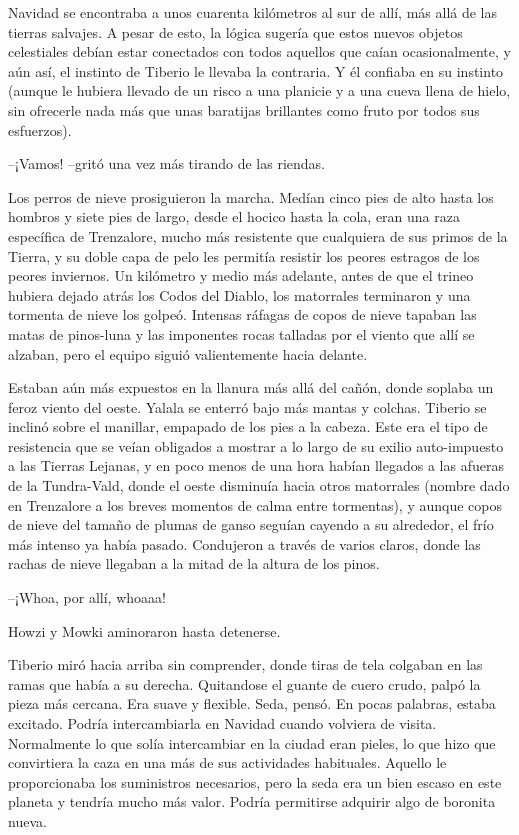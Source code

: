 Navidad se encontraba a unos cuarenta kilómetros al sur de allí, más allá de las tierras salvajes. A pesar de esto, la lógica sugería que estos nuevos objetos celestiales debían estar conectados con todos aquellos que caían ocasionalmente, y aún así, el instinto de Tiberio le llevaba la contraria. Y él confiaba en su instinto (aunque le hubiera llevado de un risco a una planicie y a una cueva llena de hielo, sin ofrecerle nada más que unas baratijas brillantes como fruto por todos sus esfuerzos).
 
--¡Vamos! --gritó una vez más tirando de las riendas.
 
Los perros de nieve prosiguieron la marcha. Medían cinco pies de alto hasta los hombros y siete pies de largo, desde el hocico hasta la cola, eran una raza específica de Trenzalore, mucho más resistente que cualquiera de sus primos de la Tierra, y su doble capa de pelo les permitía resistir los peores estragos de los peores inviernos. Un kilómetro y medio más adelante, antes de que el trineo hubiera dejado atrás los Codos del Diablo, los matorrales terminaron y una tormenta de nieve los golpeó. Intensas ráfagas de copos de nieve tapaban las matas de pinos-luna y las imponentes rocas talladas por el viento que allí se alzaban, pero el equipo siguió valientemente hacia delante.
 
Estaban aún más expuestos en la llanura más allá del cañón, donde soplaba un feroz viento del oeste. Yalala se enterró bajo más mantas y colchas. Tiberio se inclinó sobre el manillar, empapado de los pies a la cabeza. Este era el tipo de resistencia que se veían obligados a mostrar a lo largo de su exilio auto-impuesto a las Tierras Lejanas, y en poco menos de una hora habían llegados a las afueras de la Tundra-Vald, donde el oeste disminuía hacia otros matorrales (nombre dado en Trenzalore a los breves momentos de calma entre tormentas), y aunque copos de nieve del tamaño de plumas de ganso seguían cayendo a su alrededor, el frío más intenso ya había pasado. Condujeron a través de varios claros, donde las rachas de nieve llegaban a la mitad de la altura de los pinos.
 
--¡Whoa, por allí, whoaaa!
 
Howzi y Mowki aminoraron hasta detenerse.
 
Tiberio miró hacia arriba sin comprender, donde tiras de tela colgaban en las ramas que había a su derecha. Quitandose el guante de cuero crudo, palpó la pieza más cercana. Era suave y flexible. Seda, pensó. En pocas palabras, estaba excitado. Podría intercambiarla en Navidad cuando volviera de visita. Normalmente lo que solía intercambiar en la ciudad eran pieles, lo que hizo que convirtiera la caza en una más de sus actividades habituales. Aquello le proporcionaba los suministros necesarios, pero la seda era un bien escaso en este planeta y tendría mucho más valor. Podría permitirse adquirir algo de boronita nueva.
 
